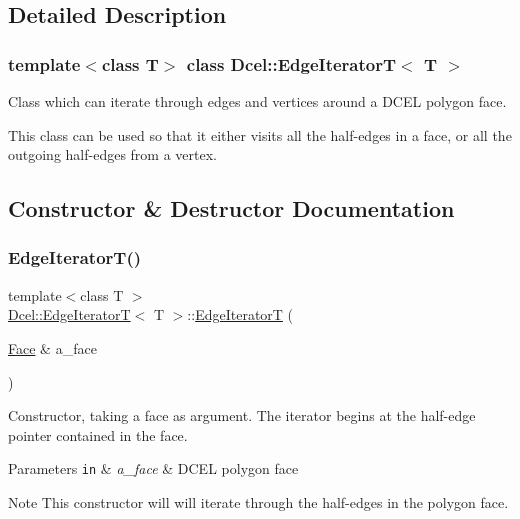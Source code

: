 \subsection{Detailed Description}
\subsubsection*{template$<$class T$>$\newline
class Dcel\+::\+Edge\+Iterator\+T$<$ T $>$}

Class which can iterate through edges and vertices around a D\+C\+EL polygon face. 

This class can be used so that it either visits all the half-\/edges in a face, or all the outgoing half-\/edges from a vertex. 

\subsection{Constructor \& Destructor Documentation}
\mbox{\label{classDcel_1_1EdgeIteratorT_aefe8b41b1b21825922096a45ce645149}} 
\subsubsection{\texorpdfstring{Edge\+Iterator\+T()}{EdgeIteratorT()}\hspace{0.1cm}{\footnotesize\ttfamily [1/4]}}
{\footnotesize\ttfamily template$<$class T $>$ \\
\hyperlink{classDcel_1_1EdgeIteratorT}{Dcel\+::\+Edge\+IteratorT}$<$ T $>$\+::\hyperlink{classDcel_1_1EdgeIteratorT}{Edge\+IteratorT} (\begin{DoxyParamCaption}\item[{\hyperlink{classDcel_1_1EdgeIteratorT_a59cc24c2a7a6a12c5c60bc04b0ac7497}{Face} \&}]{a\+\_\+face }\end{DoxyParamCaption})\hspace{0.3cm}{\ttfamily [inline]}}



Constructor, taking a face as argument. The iterator begins at the half-\/edge pointer contained in the face. 


\begin{DoxyParams}[1]{Parameters}
\mbox{\tt in}  & {\em a\+\_\+face} & D\+C\+EL polygon face \\
\hline
\end{DoxyParams}
\begin{DoxyNote}{Note}
This constructor will will iterate through the half-\/edges in the polygon face. 
\end{DoxyNote}
\mbox{\label{classDcel_1_1EdgeIteratorT_a1e47d3f1320c6ce4f37e1772ed936451}} 
